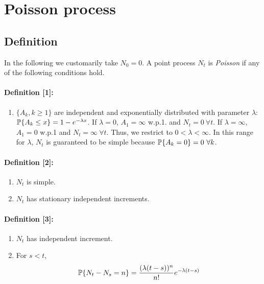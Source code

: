 \documentclass[all-lectures.tex]{subfiles}
\begin{document}
\section{Poisson process}
\subsection{Definition}
In the following we customarily take $N_0 = 0$. A point process $N_t$ is \textit{Poisson} if any of the following conditions hold.
\paragraph{Definition [1]:}{
\begin{enumerate}
\item $\{A_k, k \geq 1\}$ are independent and exponentially distributed with parameter $\lambda$: $\P\{A_k \leq x\} = 1 - e^{-\lambda x}$. If $\lambda = 0$, $A_1 = \infty$ w.p.1. and $N_t = 0 \ \forall t$. If $\lambda = \infty$, $A_1 = 0$ w.p.1 and $N_t = \infty \ \forall t$. Thus, we restrict to $0<\lambda<\infty$. In this range for $\lambda$, $N_t$ is guaranteed to be simple because $\P\{A_k = 0\} = 0 \ \forall k$.
\end{enumerate}
}

\paragraph{Definition [2]:}{
\begin{enumerate}
\item $N_t$ is simple.
\item $N_t$ has stationary independent increments.
\end{enumerate}
}
\paragraph{Definition [3]:}{
\begin{enumerate}
\item $N_t$ has independent increment.
\item For $s < t$, 
	\begin{align*}
	\P\{N_t - N_s = n\} = \frac{(\lambda (t-s))^n}{n!} e^{-\lambda (t-s)}
	\end{align*}
\end{enumerate}
}
\end{document}
